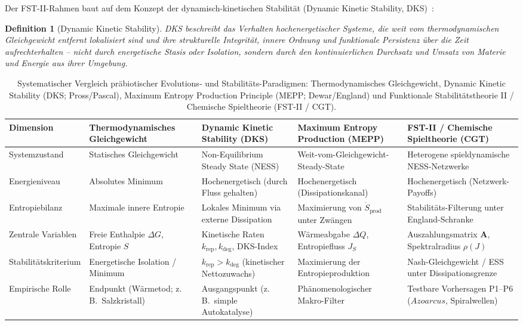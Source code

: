 \documentclass[12pt,a4paper]{article}
\newtheorem{definition}{Definition}
\theoremstyle{remark}
\begin{document}
Der FST-II-Rahmen baut auf dem Konzept der dynamisch-kinetischen Stabilität (Dynamic Kinetic Stability, DKS)~\citep{Pross2012}:

\begin{definition}[Dynamic Kinetic Stability]
DKS beschreibt das Verhalten hochenergetischer Systeme, die weit vom thermodynamischen Gleichgewicht entfernt lokalisiert sind und ihre strukturelle Integrität, innere Ordnung und funktionale Persistenz über die Zeit aufrechterhalten -- nicht durch energetische Stasis oder Isolation, sondern durch den kontinuierlichen Durchsatz und Umsatz von Materie und Energie aus ihrer Umgebung.
\end{definition}

\begin{table}[htbp]
\centering
\caption{Systematischer Vergleich präbiotischer Evolutions- und Stabilitäts-Paradigmen: Thermodynamisches Gleichgewicht, Dynamic Kinetic Stability (DKS; Pross/Pascal), Maximum Entropy Production Principle (MEPP; Dewar/England) und Funktionale Stabilitätstheorie II / Chemische Spieltheorie (FST-II / CGT).}
\label{tab:paradigm-comparison}
\scriptsize
\setlength{\tabcolsep}{3pt}
\begin{tabularx}{\textwidth}{@{}>{\RaggedRight\arraybackslash}p{}>{\RaggedRight\arraybackslash}p{}>{\RaggedRight\arraybackslash}p{}>{\RaggedRight\arraybackslash}p{}>{\RaggedRight\arraybackslash}X@{}}
\toprule
\textbf{Dimension} & \textbf{Thermo\-dynamisches Gleichgewicht} & \textbf{Dynamic Kinetic Stability (DKS)} & \textbf{Maximum Entropy Production (MEPP)} & \textbf{FST-II / Chemische Spieltheorie (CGT)} \\
\midrule
System\-zustand & Statisches Gleichgewicht & Non-Equilibrium Steady State (NESS) & Weit-vom-Gleichgewicht-Steady-State & Heterogene spieldynamische NESS-Netzwerke \\
Energieniveau & Absolutes Minimum & Hochenergetisch (durch Fluss gehalten) & Hochenergetisch (Dissipationskanal) & Hochenergetisch (Netzwerk-Payoffs) \\
Entropiebilanz & Maximale innere Entropie & Lokales Minimum via externe Dissipation & Maximierung von $\dot{S}_{\text{prod}}$ unter Zwängen & Stabilitäts-Filterung unter England-Schranke \\
Zentrale Variablen & Freie Enthalpie $\Delta G$, Entropie $S$ & Kinetische Raten $k_{\text{rep}}, k_{\text{deg}}$, DKS-Index & Wärmeabgabe $\Delta Q$, Entropiefluss $J_S$ & Auszahlungsmatrix $\mathbf{A}$, Spektralradius $\rho(J)$ \\
Stabilitäts\-kriterium & Energetische Isolation / Minimum & $k_{\text{rep}} > k_{\text{deg}}$ (kinetischer Nettozuwachs) & Maximierung der Entropieproduktion & Nash-Gleichgewicht / ESS unter Dissipationsgrenze \\
Empirische Rolle & Endpunkt (Wärmetod; z.\,B.\ Salzkristall) & Ausgangspunkt (z.\,B.\ simple Autokatalyse) & Phänomenologischer Makro-Filter & Testbare Vorhersagen P1--P6 ($Azoarcus$, Spiralwellen) \\
\bottomrule
\end{tabularx}
\end{table}
\end{document}

